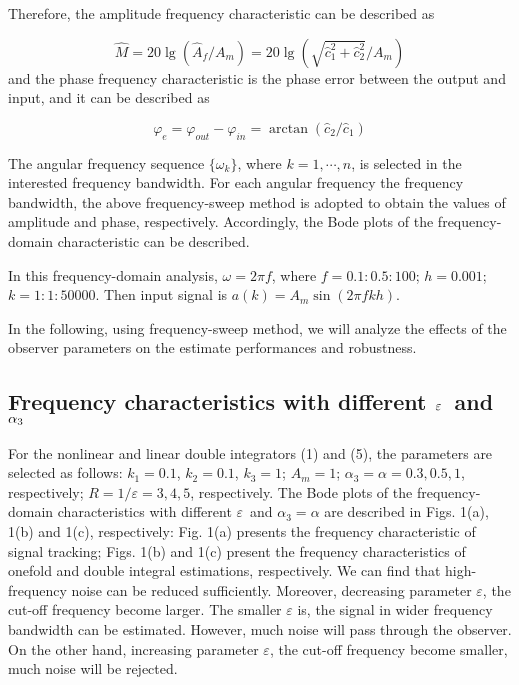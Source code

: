 \documentclass[10pt,journal]{IEEEtran}
\begin{document}
Therefore, the amplitude frequency characteristic can be described as

\begin{equation}
\hat{M}=20\lg (\hat{A}_{f}/A_{m})=20\lg (\sqrt{\hat{c}_{1}^{2}+\hat{c}_{2}^{2}}/A_{m})
\end{equation}and the phase frequency characteristic is the phase error between the output
and input, and it can be described as

\begin{equation}
\varphi _{e}=\varphi _{out}-\varphi _{in}=\arctan (\hat{c}_{2}/\hat{c}_{1})
\end{equation}

The angular frequency sequence $\{\omega _{k}\}$, where $k=1,\cdots ,n$, is
selected in the interested frequency bandwidth. For each angular frequency
the frequency bandwidth, the above frequency-sweep method is adopted to
obtain the values of amplitude and phase, respectively. Accordingly, the
Bode plots of the frequency-domain characteristic can be described.

In this frequency-domain analysis, $\omega =2\pi f$, where $f=0.1:0.5:100$; $h=0.001$; $k=1:1:50000$. Then input signal is $a(k)=A_{m}\sin (2\pi fkh)$.

In the following, using frequency-sweep method, we will analyze the effects
of the observer parameters on the estimate performances and robustness.

\subsection{Frequency characteristics with different $\protect\varepsilon $\
and $\protect\alpha _{3}$}

For the nonlinear and linear double integrators (1) and (5), the parameters
are selected as follows: $k_{1}=0.1$, $k_{2}=0.1$, $k_{3}=1$; $A_{m}=1$; $\alpha _{3}=\alpha =0.3,0.5,1$, respectively; $R=1/\varepsilon =3,4,5$,
respectively. The Bode plots of the frequency-domain characteristics with
different $\varepsilon $\ and $\alpha _{3}=\alpha $ are described in Figs.
1(a), 1(b) and 1(c), respectively: Fig. 1(a) presents the frequency
characteristic of signal tracking; Figs. 1(b) and 1(c) present the frequency
characteristics of onefold and double integral estimations, respectively. We
can find that high-frequency noise can be reduced sufficiently. Moreover,
decreasing parameter $\varepsilon $, the cut-off frequency become larger.
The smaller $\varepsilon $ is, the signal in wider frequency bandwidth can
be estimated. However, much noise will pass through the observer. On the
other hand, increasing parameter $\varepsilon $, the cut-off frequency
become smaller, much noise will be rejected.
\end{document}
